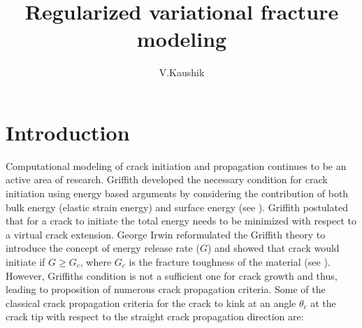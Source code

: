 \documentclass[11pt] {article}
\begin{document}
\title{Regularized variational fracture modeling}
\author{V.Kaushik}
\maketitle
\section{Introduction}
Computational modeling of crack initiation and propagation continues to be an active area of research. Griffith developed the necessary condition for crack initiation using energy based arguments by considering the contribution of both bulk energy (elastic strain energy) and surface energy (see \cite{griffith_1921}). Griffith postulated that for a crack to initiate the total energy needs to be minimized with respect to a virtual crack extension. George Irwin reformulated the Griffith theory to introduce the concept of energy release rate ($G$) and showed that crack would initiate if $G \ge G_c$, where $G_c$ is the fracture toughness of the material (see \cite{irwin_1997}). However, Griffiths condition is not a sufficient one for crack growth and thus, leading to proposition of numerous crack propagation criteria. Some of the classical crack propagation criteria for the crack to kink at an angle $\theta_c$ at the crack tip with respect to the straight crack propagation direction are:
\end{document}
